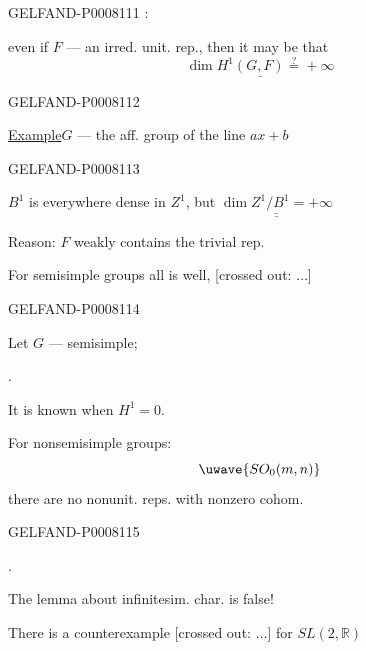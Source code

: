 \begin{GelfandAdjacentEvidence}{GELFAND-P000811}{1}
:

even if \(F\) — an irred. unit. rep., then it may be that
\[
\underline{\dim H^1(G,F)\mathrel{\overset{?}{=}}+\infty}
\]
\end{GelfandAdjacentEvidence}
\begin{GelfandAdjacentEvidence}{GELFAND-P000811}{2}


\uline{Example}\qquad \(G\) — the aff. group of the line\quad
\quad \(ax+b\)
\end{GelfandAdjacentEvidence}
\begin{GelfandAdjacentEvidence}{GELFAND-P000811}{3}


\(B^1\) is everywhere dense in \(Z^1\), but \(\underline{\underline{\dim Z^1/B^1=+\infty}}\)

Reason: \(F\) weakly contains the trivial rep.

For semisimple groups all is well,
[crossed out: \(\ldots\)]
\end{GelfandAdjacentEvidence}
\begin{GelfandAdjacentEvidence}{GELFAND-P000811}{4}


Let \(G\) — semisimple;

.

It is known when \(H^1=0\).

For nonsemisimple groups:
\[
\text{\uwave{\(\displaystyle SO_0(m,n)\)}}
\]
there are no nonunit. reps. with nonzero cohom.

\end{GelfandAdjacentEvidence}
\begin{GelfandAdjacentEvidence}{GELFAND-P000811}{5}


.

The lemma about infinitesim. char. is false!

There is a counterexample [crossed out: \(\ldots\)] for \(SL(2,\mathbb R)\)
\end{GelfandAdjacentEvidence}
